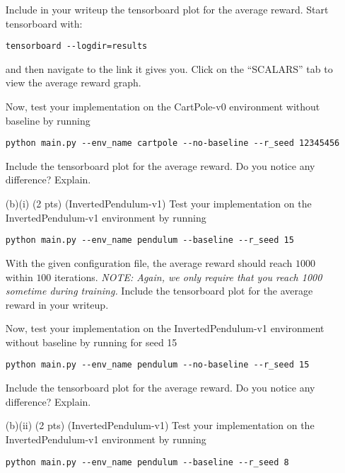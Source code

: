 \documentclass{article}
\begin{document}
\begin{enumerate}
Include in your writeup the tensorboard plot for the average reward. Start tensorboard with:
\begin{tcolorbox}
\begin{verbatim}
tensorboard --logdir=results
\end{verbatim}
\end{tcolorbox}
and then navigate to the link it gives you. Click on the ``SCALARS'' tab to view the average reward graph.

Now, test your implementation on the CartPole-v0 environment without baseline by running
\begin{tcolorbox}
\begin{verbatim}
python main.py --env_name cartpole --no-baseline --r_seed 12345456
\end{verbatim}
\end{tcolorbox}
Include the tensorboard plot for the average reward. Do you notice any difference? Explain.

\item[(b)(i) (2 pts)](InvertedPendulum-v1)
Test your implementation on the InvertedPendulum-v1 environment by running
\begin{tcolorbox}
\begin{verbatim}
python main.py --env_name pendulum --baseline --r_seed 15
\end{verbatim}
\end{tcolorbox}

With the given configuration file, the average reward should reach $1000$ within $100$ iterations. \emph{NOTE: Again, we only require that you reach 1000 sometime during training.} Include the tensorboard plot for the average reward in your writeup.

Now, test your implementation on the InvertedPendulum-v1 environment without baseline by running for seed 15
\begin{tcolorbox}
\begin{verbatim}
python main.py --env_name pendulum --no-baseline --r_seed 15
\end{verbatim}
\end{tcolorbox}
Include the tensorboard plot for the average reward. Do you notice any difference? Explain.

\item[(b)(ii) (2 pts)](InvertedPendulum-v1)
Test your implementation on the InvertedPendulum-v1 environment by running
\begin{tcolorbox}
\begin{verbatim}
python main.py --env_name pendulum --baseline --r_seed 8
\end{verbatim}
\end{tcolorbox}


\end{enumerate}
\end{document}
